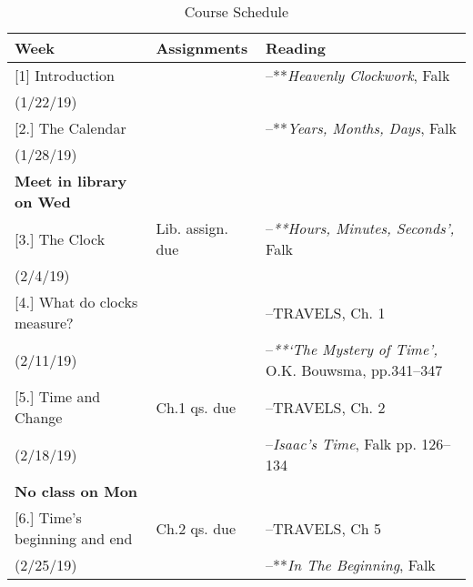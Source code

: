 \documentclass[article,oneside]{memoir}
\begin{document}
\begin{center}
\begin{longtable}{p{4.5cm}p{2.5cm}p{6cm}}
 
  \caption{Course Schedule} \\
  \toprule
  \textbf{Week} &\textbf{Assignments} & \textbf{Reading} \\
  \midrule


[1] Introduction		  		& 	& --**\emph{Heavenly Clockwork}, Falk	\\
(1/22/19)					&	&    \\ [1.8\baselineskip]

[2.] The Calendar			& 				& --**\emph{Years, Months, Days}, Falk \\
(1/28/19)			        		& 				&   \\
\textbf{Meet in library on Wed} &  & \\  [1.8\baselineskip]


[3.] The Clock   	&   Lib. assign. due		  	&  		--\emph{**Hours, Minutes, Seconds',} Falk  \\
(2/4/19)		 &						&    \\  [1.8\baselineskip]



[4.] What do clocks measure?	& 	& --TRAVELS, Ch. 1\\
(2/11/19)				        	& 	& --\emph{**`The Mystery of Time',} O.K. Bouwsma, pp.341--347 \\ [1.8\baselineskip]

[5.] Time and Change	 	& Ch.1 qs. due	& --TRAVELS, Ch. 2\\
(2/18/19)				  	 &  	& --\emph{Isaac's Time}, Falk pp. 126--134 \\ 
\textbf{No class on Mon}		& 	&	\\[1.8\baselineskip]


[6.] Time's beginning and end	 &  Ch.2 qs. due 	&--TRAVELS, Ch 5  \\
(2/25/19)			        	&	&  --**\emph{In The Beginning}, Falk\\ [1.8\baselineskip]



\end{longtable}
\end{center}
\end{document}
